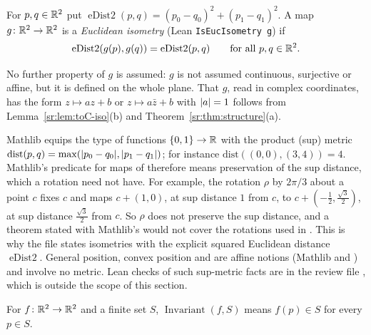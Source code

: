 \begin{definition}\label{sr:def:iso}
For $p,q\in\mathbb R^2$ put $\operatorname{eDist2}(p,q)=(p_0-q_0)^2+(p_1-q_1)^2$. A map $g\colon\mathbb R^2\to\mathbb R^2$ is a
\emph{Euclidean isometry} (Lean \texttt{IsEucIsometry g}) if
\[
  \operatorname{eDist2}(g(p),g(q))=\operatorname{eDist2}(p,q)\qquad\text{for all }p,q\in\mathbb R^2 .
\]
\end{definition}

No further property of $g$ is assumed: $g$ is not assumed continuous, surjective or affine, but it is defined on the
whole plane. That $g$, read in complex coordinates, has the form $z\mapsto az+b$ or $z\mapsto a\bar z+b$ with
$\lvert a\rvert=1$ follows from Lemma~\ref{sr:lem:toC-iso}(b) and Theorem~\ref{sr:thm:structure}(a).

\begin{remark}\label{sr:rem:sup}
Mathlib equips the type  of functions $\{0,1\}\to\mathbb R$ with the product (sup) metric
$\mathrm{dist}(p,q)=\max(\lvert p_0-q_0\rvert,\lvert p_1-q_1\rvert)$; for instance $\mathrm{dist}((0,0),(3,4))=4$. Mathlib's predicate
 for maps of  therefore means preservation of the sup distance, which a rotation need not
have. For example, the rotation $\rho$ by $2\pi/3$ about a point $c$ fixes $c$ and maps $c+(1,0)$, at sup distance $1$
from $c$, to $c+(-\tfrac12,\tfrac{\sqrt3}{2})$, at sup distance $\tfrac{\sqrt3}{2}$ from $c$. So $\rho$ does not preserve
the sup distance, and a theorem stated with Mathlib's  would not cover the rotations used in
. This is why the file states isometries with the explicit squared Euclidean distance
$\operatorname{eDist2}$. General position, convex position and  are affine notions (Mathlib
 and ) and involve no metric. Lean checks of such sup-metric facts are in the
review file , which is outside the scope of this section.
\end{remark}

\begin{definition}\label{sr:def:inv}
For $f\colon\mathbb R^2\to\mathbb R^2$ and a finite set $S$, $\operatorname{Invariant}(f,S)$ means $f(p)\in S$ for every $p\in S$.
\end{definition}

